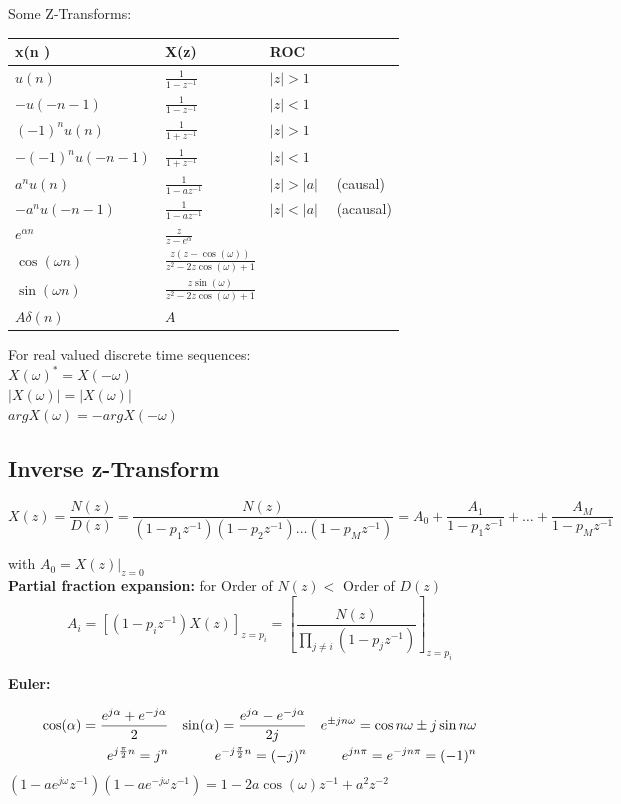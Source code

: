 Some Z-Transforms:\\
\begin{tabularx}{0.6\textwidth}{|X|X|X|}
	\hline
	\textbf{x(n} ) & \textbf{X(z}) & \textbf{ROC} \\
	\hline
	$u(n)$ & $\frac{1}{1 - z^{-1}}$ & $|z|>1$ \\
	\hline
	$-u(-n-1)$ & $\frac{1}{1 - z^{-1}}$ & $|z|<1$ \\
	\hline
	$(-1)^n u(n)$ & $\frac{1}{1 + z^{-1}}$ & $|z|>1$ \\
	\hline
	$-(-1)^n u(-n-1)$ & $\frac{1}{1 + z^{-1}}$ & $|z|<1$ \\
	\hline
	$a^n u(n)$ & $\frac{1}{1 - az^{-1}}$ & $|z|>|a| \quad$ (causal) \\
	\hline
	$-a^n u(-n-1)$ & $\frac{1}{1 - az^{-1}}$ & $|z|<|a| \quad$ (acausal) \\
	\hline
	$e^{\alpha n}$ & $\frac{z}{z-e^{\alpha}}$ & \\
	\hline
	$\cos(\omega n)$ & $\frac{z(z-\cos(\omega))}{z^2 -2z\cos(\omega) + 1}$ & \\
	\hline
	$\sin(\omega n)$ & $\frac{z\sin(\omega)}{z^2 -2z\cos(\omega) + 1}$ & \\
	\hline
	$A\delta(n)$ & $A$ & \\
	\hline
\end{tabularx}
\begin{minipage}[b][5.4cm][t]{5cm}
	For real valued discrete time sequences:\\
	$X(\omega)^* = X(-\omega)$ \\
	$|X(\omega)| = |X(\omega)|$\\
	$argX(\omega) = -argX(-\omega)$
\end{minipage}


\subsection{Inverse z-Transform}

$X(z) = \dfrac{N(z)}{D(z)} = \dfrac{N(z)}{(1-p_1z^{-1})(1-p_2z^{-1})\ldots(1-p_Mz^{-1})} = 
A_0 + \dfrac{A_1}{1-p_1z^{-1}} + \ldots + \dfrac{A_M}{1-p_Mz^{-1}}$

with $A_0 = X(z)|_{z=0}$ \\

\textbf{Partial fraction expansion:} for Order of $N(z) <$ Order of $D(z)$ \\
\[A_i = [(1-p_iz^{-1})X(z)]_{z=p_i} = \left[\frac{N(z)}{\prod\limits_{j\neq i}(1-p_jz^{-1})}\right]_{z=p_i}\]

\textbf{Euler:}

\begin{align}
\cos(\alpha) = \frac{e^{j\alpha} + e^{-j\alpha}}{2}
&& \sin(\alpha) = \frac{e^{j\alpha} - e^{-j\alpha}}{2j} && 
    {e}^{\pm jn\omega} = \cos{n\omega} \pm j \sin{n\omega} \notag\\
e^{j\frac{\pi}{2}n} = j^n & & e^{-j\frac{\pi}{2}n} = (-j)^n &&
e^{jn\pi}=e^{-jn\pi}=(-1)^n \notag
\end{align}
$(1-ae^{j\omega}z^{-1})(1-ae^{-j\omega}z^{-1}) = 1 - 2a\cos(\omega)z^{-1}+a^2z^{-2}$


